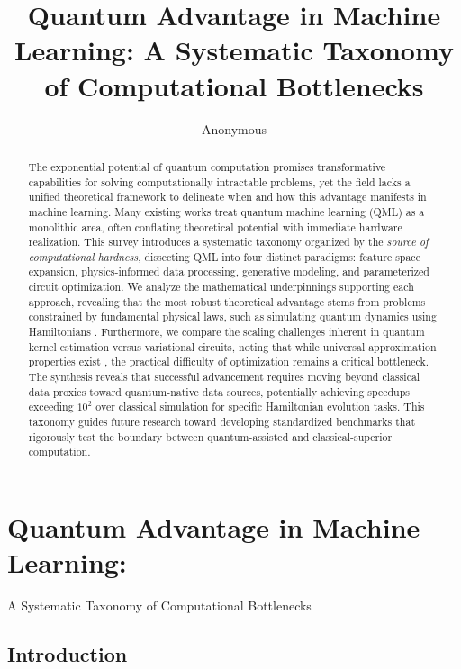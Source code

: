 \documentclass{article}
\title{Quantum Advantage in Machine Learning: A Systematic Taxonomy of Computational Bottlenecks}
\author{Anonymous}
\begin{document}
\begin{abstract}
The exponential potential of quantum computation promises transformative capabilities for solving computationally intractable problems, yet the field lacks a unified theoretical framework to delineate when and how this advantage manifests in machine learning. Many existing works treat quantum machine learning (QML) as a monolithic area, often conflating theoretical potential with immediate hardware realization. This survey introduces a systematic taxonomy organized by the \textit{source of computational hardness}, dissecting QML into four distinct paradigms: feature space expansion, physics-informed data processing, generative modeling, and parameterized circuit optimization. We analyze the mathematical underpinnings supporting each approach, revealing that the most robust theoretical advantage stems from problems constrained by fundamental physical laws, such as simulating quantum dynamics using Hamiltonians . Furthermore, we compare the scaling challenges inherent in quantum kernel estimation versus variational circuits, noting that while universal approximation properties exist \cite{goto2021universal}, the practical difficulty of optimization remains a critical bottleneck. The synthesis reveals that successful advancement requires moving beyond classical data proxies toward quantum-native data sources, potentially achieving speedups exceeding $10^2$ over classical simulation for specific Hamiltonian evolution tasks. This taxonomy guides future research toward developing standardized benchmarks that rigorously test the boundary between quantum-assisted and classical-superior computation.
\end{abstract}

\maketitle

\section{Quantum Advantage in Machine Learning:}

\label{sec:quantum\_advantage\_in\_machine\_learning}

A Systematic Taxonomy of Computational Bottlenecks

\subsection{Introduction}
\end{document}
